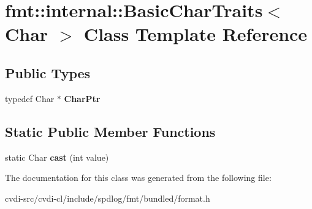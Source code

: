 \hypertarget{classfmt_1_1internal_1_1BasicCharTraits}{}\section{fmt\+:\+:internal\+:\+:Basic\+Char\+Traits$<$ Char $>$ Class Template Reference}
\label{classfmt_1_1internal_1_1BasicCharTraits}
\subsection*{Public Types}
\begin{DoxyCompactItemize}
\item 
typedef Char $\ast$ {\bfseries Char\+Ptr}\hypertarget{classfmt_1_1internal_1_1BasicCharTraits_a32f5cad709328e0450b8690960d6b8b5}{}\label{classfmt_1_1internal_1_1BasicCharTraits_a32f5cad709328e0450b8690960d6b8b5}

\end{DoxyCompactItemize}
\subsection*{Static Public Member Functions}
\begin{DoxyCompactItemize}
\item 
static Char {\bfseries cast} (int value)\hypertarget{classfmt_1_1internal_1_1BasicCharTraits_a5ec7e07adb183b9bf1e63a7507382ec6}{}\label{classfmt_1_1internal_1_1BasicCharTraits_a5ec7e07adb183b9bf1e63a7507382ec6}

\end{DoxyCompactItemize}


The documentation for this class was generated from the following file\+:\begin{DoxyCompactItemize}
\item 
cvdi-\/src/cvdi-\/cl/include/spdlog/fmt/bundled/format.\+h\end{DoxyCompactItemize}
